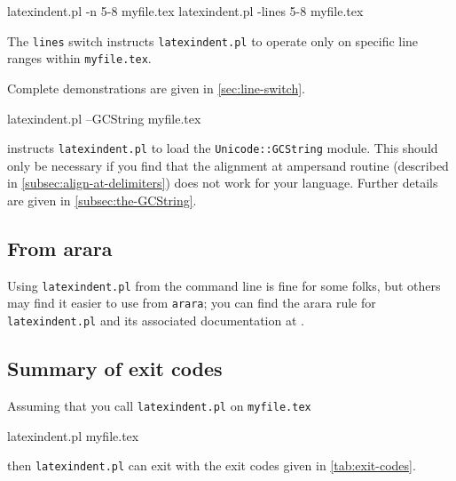 \documentclass[10pt]{article}
\newcommand{\flagbox}[1]{%
 \par
 \makebox[30pt][l]{%
  \hspace{-1cm}%
  \ttfamily\fontseries{b}\selectfont #1
 }%
}
\begin{document}
\flagbox{-n, --lines=MIN-MAX}

 \begin{commandshell}
latexindent.pl -n 5-8 myfile.tex
latexindent.pl -lines 5-8 myfile.tex
\end{commandshell}

  The \texttt{lines} switch instructs
 \texttt{latexindent.pl} to operate only on specific line ranges within
 \texttt{myfile.tex}.

 Complete demonstrations are given in \cref{sec:line-switch}.

\flagbox{--GCString}

 \begin{commandshell}
latexindent.pl --GCString myfile.tex
\end{commandshell}

  instructs \texttt{latexindent.pl} to load the
 \texttt{Unicode::GCString} module. This should only be necessary if you find that the
 alignment at ampersand routine (described in \cref{subsec:align-at-delimiters}) does not
 work for your language. Further details are given in \cref{subsec:the-GCString}.

\subsection{From arara}\label{sec:arara}
 Using \texttt{latexindent.pl} from the command line is fine for some folks, but others
 may find it easier to use from \texttt{arara}; you can find the arara rule for
 \texttt{latexindent.pl} and its associated documentation at \cite{paulo}.

\subsection{Summary of exit codes}
 Assuming that you call \texttt{latexindent.pl} on \texttt{myfile.tex}

 \begin{commandshell}
latexindent.pl myfile.tex
\end{commandshell}

 then \texttt{latexindent.pl} can exit with the exit codes given in
 \cref{tab:exit-codes}.
\end{document}
